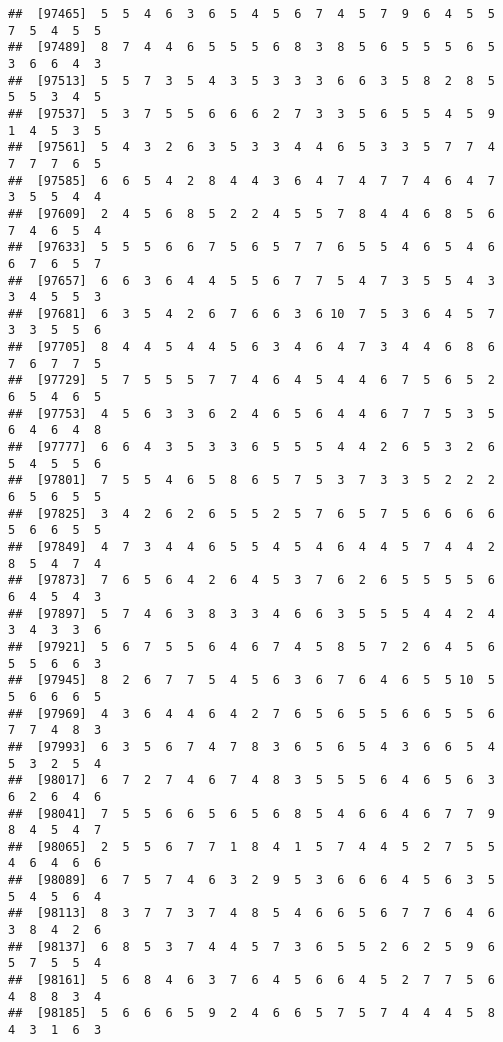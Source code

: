 \documentclass[
]{book}
\begin{document}
\begin{verbatim}
##  [97465]  5  5  4  6  3  6  5  4  5  6  7  4  5  7  9  6  4  5  5  7  5  4  5  5
##  [97489]  8  7  4  4  6  5  5  5  6  8  3  8  5  6  5  5  5  6  5  3  6  6  4  3
##  [97513]  5  5  7  3  5  4  3  5  3  3  3  6  6  3  5  8  2  8  5  5  5  3  4  5
##  [97537]  5  3  7  5  5  6  6  6  2  7  3  3  5  6  5  5  4  5  9  1  4  5  3  5
##  [97561]  5  4  3  2  6  3  5  3  3  4  4  6  5  3  3  5  7  7  4  7  7  7  6  5
##  [97585]  6  6  5  4  2  8  4  4  3  6  4  7  4  7  7  4  6  4  7  3  5  5  4  4
##  [97609]  2  4  5  6  8  5  2  2  4  5  5  7  8  4  4  6  8  5  6  7  4  6  5  4
##  [97633]  5  5  5  6  6  7  5  6  5  7  7  6  5  5  4  6  5  4  6  6  7  6  5  7
##  [97657]  6  6  3  6  4  4  5  5  6  7  7  5  4  7  3  5  5  4  3  3  4  5  5  3
##  [97681]  6  3  5  4  2  6  7  6  6  3  6 10  7  5  3  6  4  5  7  3  3  5  5  6
##  [97705]  8  4  4  5  4  4  5  6  3  4  6  4  7  3  4  4  6  8  6  7  6  7  7  5
##  [97729]  5  7  5  5  5  7  7  4  6  4  5  4  4  6  7  5  6  5  2  6  5  4  6  5
##  [97753]  4  5  6  3  3  6  2  4  6  5  6  4  4  6  7  7  5  3  5  6  4  6  4  8
##  [97777]  6  6  4  3  5  3  3  6  5  5  5  4  4  2  6  5  3  2  6  5  4  5  5  6
##  [97801]  7  5  5  4  6  5  8  6  5  7  5  3  7  3  3  5  2  2  2  6  5  6  5  5
##  [97825]  3  4  2  6  2  6  5  5  2  5  7  6  5  7  5  6  6  6  6  5  6  6  5  5
##  [97849]  4  7  3  4  4  6  5  5  4  5  4  6  4  4  5  7  4  4  2  8  5  4  7  4
##  [97873]  7  6  5  6  4  2  6  4  5  3  7  6  2  6  5  5  5  5  6  6  4  5  4  3
##  [97897]  5  7  4  6  3  8  3  3  4  6  6  3  5  5  5  4  4  2  4  3  4  3  3  6
##  [97921]  5  6  7  5  5  6  4  6  7  4  5  8  5  7  2  6  4  5  6  5  5  6  6  3
##  [97945]  8  2  6  7  7  5  4  5  6  3  6  7  6  4  6  5  5 10  5  5  6  6  6  5
##  [97969]  4  3  6  4  4  6  4  2  7  6  5  6  5  5  6  6  5  5  6  7  7  4  8  3
##  [97993]  6  3  5  6  7  4  7  8  3  6  5  6  5  4  3  6  6  5  4  5  3  2  5  4
##  [98017]  6  7  2  7  4  6  7  4  8  3  5  5  5  6  4  6  5  6  3  6  2  6  4  6
##  [98041]  7  5  5  6  6  5  6  5  6  8  5  4  6  6  4  6  7  7  9  8  4  5  4  7
##  [98065]  2  5  5  6  7  7  1  8  4  1  5  7  4  4  5  2  7  5  5  4  6  4  6  6
##  [98089]  6  7  5  7  4  6  3  2  9  5  3  6  6  6  4  5  6  3  5  5  4  5  6  4
##  [98113]  8  3  7  7  3  7  4  8  5  4  6  6  5  6  7  7  6  4  6  3  8  4  2  6
##  [98137]  6  8  5  3  7  4  4  5  7  3  6  5  5  2  6  2  5  9  6  5  7  5  5  4
##  [98161]  5  6  8  4  6  3  7  6  4  5  6  6  4  5  2  7  7  5  6  4  8  8  3  4
##  [98185]  5  6  6  6  5  9  2  4  6  6  5  7  5  7  4  4  4  5  8  4  3  1  6  3

\end{verbatim}
\end{document}
